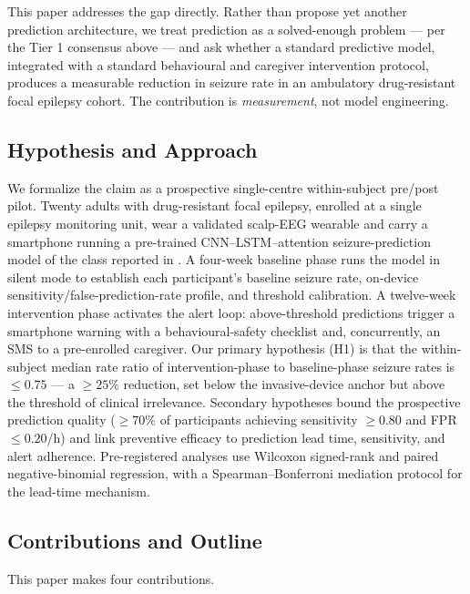 This paper addresses the gap directly. Rather than propose yet another prediction architecture, we treat prediction as a solved-enough problem --- per the Tier 1 consensus above --- and ask whether a standard predictive model, integrated with a standard behavioural and caregiver intervention protocol, produces a measurable reduction in seizure rate in an ambulatory drug-resistant focal epilepsy cohort. The contribution is \emph{measurement}, not model engineering.

\subsection{Hypothesis and Approach}
\label{sec:intro-hypothesis}

We formalize the claim as a prospective single-centre within-subject pre/post pilot. Twenty adults with drug-resistant focal epilepsy, enrolled at a single epilepsy monitoring unit, wear a validated scalp-EEG wearable and carry a smartphone running a pre-trained CNN--LSTM--attention seizure-prediction model of the class reported in \cite{CaoEtAl2026,AlkhrijahEtAl2025,LiEtAl2025b}. A four-week baseline phase runs the model in silent mode to establish each participant's baseline seizure rate, on-device sensitivity/false-prediction-rate profile, and threshold calibration. A twelve-week intervention phase activates the alert loop: above-threshold predictions trigger a smartphone warning with a behavioural-safety checklist and, concurrently, an SMS to a pre-enrolled caregiver. Our primary hypothesis (H1) is that the within-subject median rate ratio of intervention-phase to baseline-phase seizure rates is $\leq 0.75$ --- a $\geq 25\%$ reduction, set below the invasive-device anchor but above the threshold of clinical irrelevance. Secondary hypotheses bound the prospective prediction quality ($\geq 70\%$ of participants achieving sensitivity $\geq 0.80$ and FPR $\leq 0.20$/h) and link preventive efficacy to prediction lead time, sensitivity, and alert adherence. Pre-registered analyses use Wilcoxon signed-rank and paired negative-binomial regression, with a Spearman--Bonferroni mediation protocol for the lead-time mechanism.

\subsection{Contributions and Outline}
\label{sec:intro-contributions}

This paper makes four contributions.

